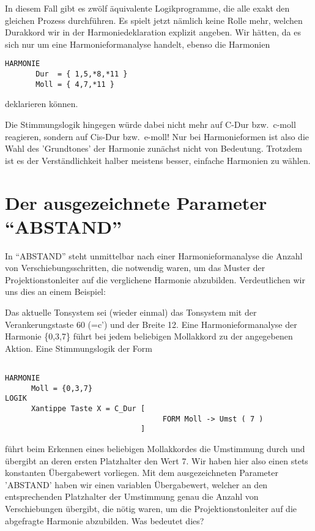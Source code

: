 In diesem Fall gibt es zwölf äquivalente Logikprogramme, die alle exakt 
den gleichen Prozess durch\-führ\-en. Es spielt jetzt nämlich keine 
Rolle mehr, 
welchen Durakkord wir in der Harmoniedeklaration explizit angeben. Wir 
hätten, da es sich nur um eine Harmonieformanalyse handelt, ebenso die 
Harmonien
\begin{verbatim}
HARMONIE
       Dur  = { 1,5,*8,*11 }
       Moll = { 4,7,*11 }
\end{verbatim}
deklarieren können.

Die Stimmungslogik  hingegen würde dabei nicht mehr auf C-Dur bzw.\ 
c-moll reagieren, sondern auf Cis-Dur bzw.\ e-moll! Nur bei 
Harmonieformen ist also die Wahl des 'Grundtones' der Harmonie zunächst 
nicht von Bedeutung. Trotzdem ist es der Verständlichkeit halber meistens 
besser, einfache Harmonien zu wählen.

\section{Der ausgezeichnete Parameter "`ABSTAND"'}
\label{sec:der-ausg-param}

In "`ABSTAND"' steht unmittelbar nach einer Harmonieformanalyse die Anzahl 
von Verschiebungsschritten, die notwendig waren, um das Muster der 
Projektionstonleiter auf die verglichene Harmonie abzubilden. 
Verdeutlichen wir uns dies an einem Beispiel:

Das aktuelle Tonsystem sei (wieder einmal) das Tonsystem  mit der 
Verankerungstaste 60 (=c') und der Breite 12. Eine Harmonieformanalyse der 
Harmonie \{0,3,7\} führt bei jedem beliebigen Mollakkord zu der 
angegebenen Aktion. Eine Stimmungslogik der Form
\begin{verbatim}

HARMONIE 
      Moll = {0,3,7}
LOGIK
      Xantippe Taste X = C_Dur [
                                    FORM Moll -> Umst ( 7 )
                               ]

\end{verbatim}

führt beim Erkennen eines beliebigen Mollakkordes die Umstimmung 
durch und übergibt an deren ersten Platzhalter den Wert 7. Wir haben hier 
also einen stets konstanten Übergabewert vorliegen. Mit dem 
ausgezeichneten Parameter 'ABSTAND' haben wir einen variablen 
Übergabewert, welcher an den entsprechenden Platzhalter der Umstimmung 
genau die Anzahl von Verschiebungen übergibt, die nötig waren, um die 
Projektionstonleiter auf die abgefragte Harmonie 
abzubilden. Was bedeutet dies?

